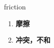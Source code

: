 
\begin{frame}
{\huge friction}
\begin{center}
\begin{enumerate}\Large
  \item \textbf{摩擦}
  \item \textbf{冲突，不和}
\end{enumerate}
\end{center}
\end{frame}
